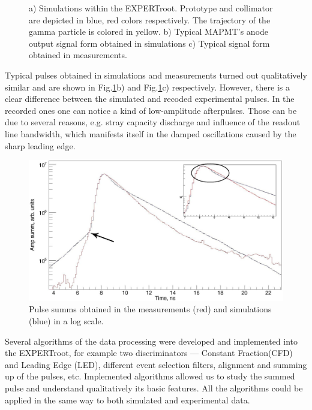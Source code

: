 \documentclass{webofc}
\newcommand{\er}{\textmd{EXPERTroot}}
\begin{document}
\begin{figure}[h]
\begin{minipage}[h]{0.35\linewidth}
	\end{minipage}
	\caption{a) Simulations within the \er. Prototype and collimator are depicted in blue, red colors respectively. The trajectory of the gamma particle is colored in yellow. b) Typical MAPMT's anode output signal form obtained in simulations c) Typical signal form obtained in measurements.}
	\label{ris:sim}
\end{figure}
Typical pulses obtained in simulations and measurements turned out qualitatively similar and are shown in Fig.\ref{ris:sim}b) and Fig.\ref{ris:sim}c) respectively. However, there is a clear difference between the simulated and recoded experimental pulses. In the recorded ones one can notice a kind of low-amplitude afterpulses.  Those can be due to several reasons, e.g. stray capacity discharge and influence of the readout line bandwidth, which manifests itself in the damped oscillations caused by the sharp leading edge.

\begin{figure}
	\centering
	\includegraphics[width=0.7\linewidth]{summ1.png}
	\caption{Pulse summs obtained in the measurements (red) and simulations (blue) in a log scale.}\label{ris:sum}
\end{figure}

Several algorithms of the data processing were developed and implemented into the \er, for example two discriminators --- Constant Fraction(CFD) and Leading Edge (LED), different event selection filters, alignment and summing up of the pulses, etc. Implemented algorithms allowed us to study the summed pulse and understand qualitatively its basic features. All the algorithms could be applied in the same way to both simulated and experimental data.

\end{document}
